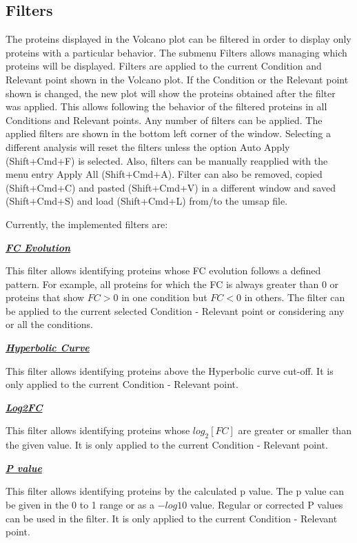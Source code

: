 \newpage
\subsection{Filters}

The proteins displayed in the Volcano plot can be filtered in order to display only
proteins with a particular behavior. The submenu Filters allows managing which 
proteins will be displayed. Filters are applied to the current Condition and Relevant
point shown in the Volcano plot. If the Condition or the Relevant point shown is
changed, the new plot will show the proteins obtained after the filter was applied.
This allows following the behavior of the filtered proteins in all Conditions and
Relevant points. Any number of filters can be applied. The applied filters are shown
in the bottom left corner of the window. Selecting a different analysis will reset
the filters unless the option Auto Apply (Shift+Cmd+F) is selected. Also, filters
can be manually reapplied with the menu entry Apply All (Shift+Cmd+A). Filter can
also be removed, copied (Shift+Cmd+C) and pasted (Shift+Cmd+V) in a different window
and saved (Shift+Cmd+S) and load (Shift+Cmd+L) from/to the umsap file.

Currently, the implemented filters are:

\textbf{\textit{\underline{FC Evolution}}}

This filter allows identifying proteins whose FC evolution follows a defined pattern.
For example, all proteins for which the FC is always greater than \num{0} or proteins
that show $FC > 0$ in one condition but $FC < 0$ in others. The filter can be applied
to the current selected Condition - Relevant point or considering any or all the
conditions.

\textbf{\textit{\underline{Hyperbolic Curve}}}

This filter allows identifying proteins above the Hyperbolic curve cut-off. It is
only applied to the current Condition - Relevant point.

\textbf{\textit{\underline{Log2FC}}}

This filter allows identifying proteins whose $log_2[FC]$ are greater or smaller
than the given value. It is only applied to the current Condition - Relevant point.

\textbf{\textit{\underline{P value}}}

This filter allows identifying proteins by the calculated p value. The p value
can be given in the 0 to 1 range or as a $-log10$ value. Regular or corrected P
values can be used in the filter. It is only applied to the current Condition -
Relevant point.

